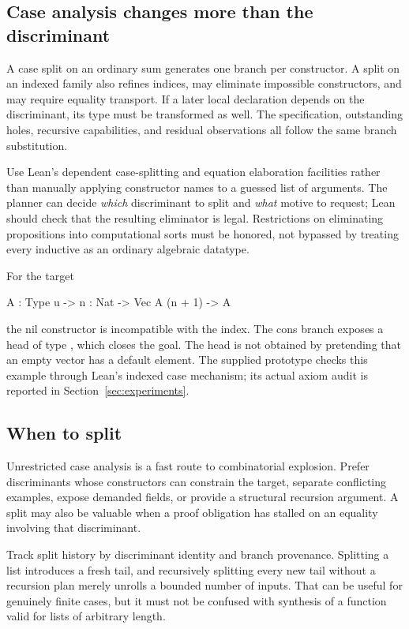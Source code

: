 \documentclass[11pt,letterpaper]{article}
\newcommand{\id}[1]{\texttt{\detokenize{#1}}}
\theoremstyle{definition}
\theoremstyle{remark}
\begin{document}
\subsection{Case analysis changes more than the discriminant}

A case split on an ordinary sum generates one branch per constructor. A split on an indexed family also refines indices, may eliminate impossible constructors, and may require equality transport. If a later local declaration depends on the discriminant, its type must be transformed as well. The specification, outstanding holes, recursive capabilities, and residual observations all follow the same branch substitution.

Use Lean's dependent case-splitting and equation elaboration facilities rather than manually applying constructor names to a guessed list of arguments. The planner can decide \emph{which} discriminant to split and \emph{what} motive to request; Lean should check that the resulting eliminator is legal. Restrictions on eliminating propositions into computational sorts must be honored, not bypassed by treating every inductive as an ordinary algebraic datatype.

For the target
\begin{code}
{A : Type u} -> {n : Nat} -> Vec A (n + 1) -> A
\end{code}
the nil constructor is incompatible with the index. The cons branch exposes a head of type \id{A}, which closes the goal. The head is not obtained by pretending that an empty vector has a default element. The supplied prototype checks this example through Lean's indexed case mechanism; its actual axiom audit is reported in Section~\ref{sec:experiments}.

\subsection{When to split}

Unrestricted case analysis is a fast route to combinatorial explosion. Prefer discriminants whose constructors can constrain the target, separate conflicting examples, expose demanded fields, or provide a structural recursion argument. A split may also be valuable when a proof obligation has stalled on an equality involving that discriminant.

Track split history by discriminant identity and branch provenance. Splitting a list introduces a fresh tail, and recursively splitting every new tail without a recursion plan merely unrolls a bounded number of inputs. That can be useful for genuinely finite cases, but it must not be confused with synthesis of a function valid for lists of arbitrary length.
\end{document}
